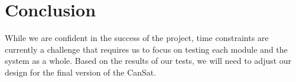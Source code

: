 \documentclass[11pt]{article}
\begin{document}

\section{Conclusion}

While we are confident in the success of the project, time constraints are currently a challenge that requires us to focus on testing each module and the system as a whole. Based on the results of our tests, we will need to adjust our design for the final version of the CanSat. 
\end{document}
